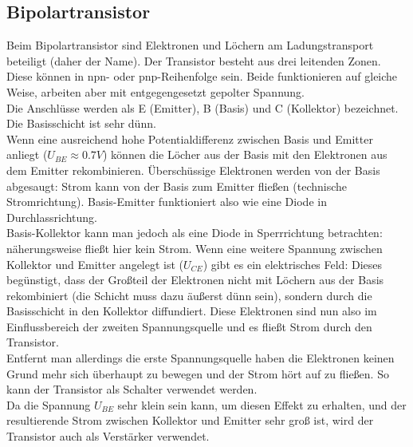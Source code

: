 \documentclass[12pt,a4paper,twopage]{article}
\begin{document}
\subsection{Bipolartransistor}
Beim Bipolartransistor sind Elektronen und Löchern am Ladungstransport beteiligt (daher der Name). Der Transistor besteht aus drei leitenden Zonen. Diese können in npn- oder pnp-Reihenfolge sein. Beide funktionieren auf gleiche Weise, arbeiten aber mit entgegengesetzt gepolter Spannung.\\
Die Anschlüsse werden als E (Emitter), B (Basis) und C (Kollektor) bezeichnet. Die Basisschicht ist sehr dünn.\\
Wenn eine ausreichend hohe Potentialdifferenz zwischen Basis und Emitter anliegt ($U_{BE}\approx 0.7V$) können die Löcher aus der Basis mit den Elektronen aus dem Emitter rekombinieren. Überschüssige Elektronen werden von der Basis abgesaugt: Strom kann von der Basis zum Emitter fließen (technische Stromrichtung). Basis-Emitter funktioniert also wie eine Diode in Durchlassrichtung.\\
Basis-Kollektor kann man jedoch als eine Diode in Sperrrichtung betrachten: näherungsweise fließt hier kein Strom. Wenn eine weitere Spannung zwischen Kollektor und Emitter angelegt ist ($U_{CE}$) gibt es ein elektrisches Feld: Dieses begünstigt, dass der Großteil der Elektronen nicht mit Löchern aus der Basis rekombiniert (die Schicht muss dazu äußerst dünn sein), sondern durch die Basisschicht in den Kollektor diffundiert. Diese Elektronen sind nun also im Einflussbereich der zweiten Spannungsquelle und es fließt Strom durch den Transistor.\\
Entfernt man allerdings die erste Spannungsquelle haben die Elektronen keinen Grund mehr sich überhaupt zu bewegen und der Strom hört auf zu fließen. So kann der Transistor als Schalter verwendet werden.\\
Da die Spannung $U_{BE}$ sehr klein sein kann, um diesen Effekt zu erhalten, und der resultierende Strom zwischen Kollektor und Emitter sehr groß ist, wird der Transistor auch als Verstärker verwendet.
\end{document}

